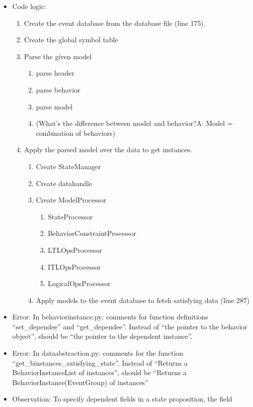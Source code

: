 \documentclass{article}
\begin{document}
\begin{itemize}
\item Code logic: 
  \begin{enumerate}
  \item Create the event database from the database file (line 175).
  \item Create the global symbol table
  \item Parse the given model
    \begin{enumerate}
    \item parse header
    \item parse behavior
    \item parse model 
    \item (What's the difference between model and behavior?A: Model = combination of behaviors)
    \end{enumerate}
  \item Apply the parsed model over the data to get instances.
    \begin{enumerate}
    \item Create StateManager
    \item Create datahandle
    \item Create ModelProcessor
      \begin{enumerate}
      \item StateProcessor
      \item BehaviorConstraintProcessor
      \item LTLOpsProcessor
      \item ITLOpsProcessor
      \item LogicalOpsProcessor
      \end{enumerate}
    \item Apply models to the event database to fetch satisfying data (line 287)
    \end{enumerate}
  \end{enumerate}
\item Error: In behaviorinstance.py: comments for function definitions
  ``set\_dependee'' and ``get\_dependee''. Instead of ``the pointer to the
  behavior object'', should be ``the pointer to the dependent instance''.
\item Error: In dataabstraction.py: comments for the function
  ``get\_binstances\_satisfying\_state''. Instead of ``Returns a
  BehaviorInstanceList of instances'', should be ``Returns a
  BehaviorInstance(EventGroup) of instances''
\item Observation: To specify dependent fields in a state proposition, the field

\end{itemize}
\end{document}
